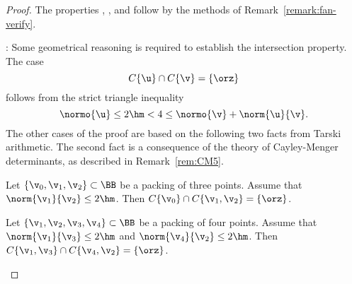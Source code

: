 \begin{proof}
The properties , , and  follow
by the methods of Remark~\ref{remark:fan-verify}.

: Some geometrical reasoning is required to
establish the intersection property.  The case
\begin{displaymath}
C\{\u\}\cap C\{\v\} = \{\orz\}
\end{displaymath}
follows from the strict triangle inequality 
\begin{displaymath}
\normo{\u} \le 2\hm < 4 \le \normo{\v} + \norm{\u}{\v}.
\end{displaymath}
The other cases of the proof are based on the following two facts from
Tarski arithmetic.  The second fact is a consequence of the theory of
Cayley-Menger determinants, as described in Remark~\ref{rem:CM5}.
\begin{description}
\item {} Let $\{\v_0,\v_1,\v_2\}\subset \BB$ be a packing of three points.
Assume that $\norm{\v_1}{\v_2}\le 2\hm$.  Then
$C\{\v_0\}\cap C\{\v_1,\v_2\} = \{\orz\}$.
\item {} Let $\{\v_1,\v_2,\v_3,\v_4\}\subset \BB$ be a packing of four
points.  Assume that $\norm{\v_1}{\v_3}\le 2\hm$ and
$\norm{\v_4}{\v_2}\le 2\hm$.  Then $C\{\v_1,\v_3\}\cap
C\{\v_4,\v_2\} = \{\orz\}$.
\end{description}
\end{proof}

